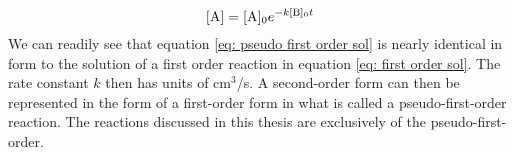 \begin{equation}
	\ce{[A]} = \ce{[A]0}e^{-k\ce{[B]0}t} \label{eq: pseudo first order sol}
\end{equation}
We can readily see that equation \ref{eq: pseudo first order sol} is nearly identical in form to the solution of a first order reaction in equation \ref{eq: first order sol}. The rate constant $k$ then has units of cm$^3$/s. A second-order form can then be represented in the form of a first-order form in what is called a pseudo-first-order reaction. The reactions discussed in this thesis are exclusively of the pseudo-first-order.

